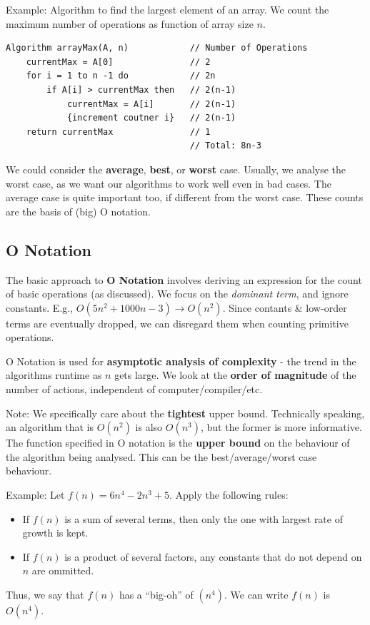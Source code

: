 \documentclass[11pt]{article}
\begin{document}
Example: Algorithm to find the largest element of an array. 
We count the maximum number of operations as function of array size $n$.
\begin{lstlisting}
Algorithm arrayMax(A, n)            // Number of Operations
    currentMax = A[0]               // 2  
    for i = 1 to n -1 do            // 2n 
        if A[i] > currentMax then   // 2(n-1)
            currentMax = A[i]       // 2(n-1)
            {increment coutner i}   // 2(n-1)
    return currentMax               // 1
                                    // Total: 8n-3
\end{lstlisting}

We could consider the \textbf{average}, \textbf{best}, or \textbf{worst} case. 
Usually, we analyse the worst case, as we want our algorithms to work well even in bad cases. 
The average case is quite important too, if different from the worst case.
These counts are the basis of (big) O notation.

\subsection{O Notation} 
The basic approach to \textbf{O Notation} involves deriving an expression for the count of basic operations (as 
discussed). 
We focus on the \textit{dominant term}, and ignore constants. 
E.g., $O(5n^2 + 1000n -3) \rightarrow O(n^2)$.
Since contants \& low-order terms are eventually dropped, we can disregard them when counting primitive operations. 

O Notation is used for \textbf{asymptotic analysis of complexity} - the trend in the algorithms runtime as $n$ 
gets large. 
We look at the \textbf{order of magnitude} of the number of actions, independent of computer/compiler/etc. 

Note: We specifically care about the \textbf{tightest} upper bound. 
Technically speaking, an algorithm that is $O(n^2)$ is also $O(n^3)$, but the former is more informative.
The function specified in O notation is the \textbf{upper bound} on the behaviour of the algorithm being analysed. 
This can be the best/average/worst case behaviour.

Example: Let $f(n) = 6n^4 -2n^3 + 5$. 
Apply the following rules:
\begin{itemize}
    \item   If $f(n)$ is a sum of several terms, then only the one with largest rate of growth is kept. 
    \item   If $f(n)$ is a product of several factors, any constants that do not depend on $n$ are ommitted. 
\end{itemize}
Thus, we say that $f(n)$ has a ``big-oh'' of $(n^4)$. 
We can write $f(n)$ is $O(n^4)$. 
\end{document}
